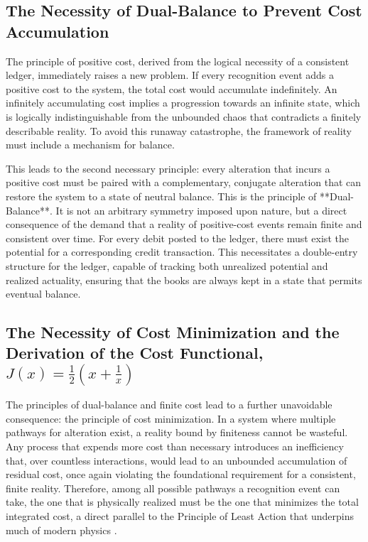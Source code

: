 \subsection{The Necessity of Dual-Balance to Prevent Cost Accumulation}
The principle of positive cost, derived from the logical necessity of a consistent ledger, immediately raises a new problem. If every recognition event adds a positive cost to the system, the total cost would accumulate indefinitely. An infinitely accumulating cost implies a progression towards an infinite state, which is logically indistinguishable from the unbounded chaos that contradicts a finitely describable reality. To avoid this runaway catastrophe, the framework of reality must include a mechanism for balance.

This leads to the second necessary principle: every alteration that incurs a positive cost must be paired with a complementary, conjugate alteration that can restore the system to a state of neutral balance. This is the principle of **Dual-Balance**. It is not an arbitrary symmetry imposed upon nature, but a direct consequence of the demand that a reality of positive-cost events remain finite and consistent over time. For every debit posted to the ledger, there must exist the potential for a corresponding credit transaction. This necessitates a double-entry structure for the ledger, capable of tracking both unrealized potential and realized actuality, ensuring that the books are always kept in a state that permits eventual balance.

\subsection{The Necessity of Cost Minimization and the Derivation of the Cost Functional, \texorpdfstring{$J(x) = \frac{1}{2}(x + \frac{1}{x})$}{J(x) = 1/2(x + 1/x)}}

The principles of dual-balance and finite cost lead to a further unavoidable consequence: the principle of cost minimization. In a system where multiple pathways for alteration exist, a reality bound by finiteness cannot be wasteful. Any process that expends more cost than necessary introduces an inefficiency that, over countless interactions, would lead to an unbounded accumulation of residual cost, once again violating the foundational requirement for a consistent, finite reality. Therefore, among all possible pathways a recognition event can take, the one that is physically realized must be the one that minimizes the total integrated cost, a direct parallel to the Principle of Least Action that underpins much of modern physics \cite{Landau1976}.

